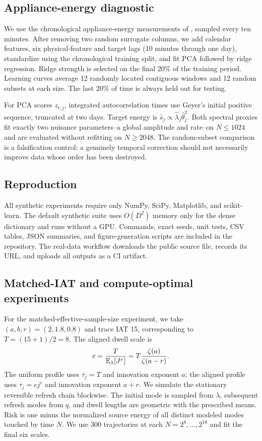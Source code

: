 \subsection{Appliance-energy diagnostic}
We use the chronological appliance-energy measurements of
\citet{candanedo2017appliances}, sampled every ten minutes. After removing two
random surrogate columns, we add calendar features, six physical-feature and
target lags (10 minutes through one day), standardize using the chronological
training split, and fit PCA followed by ridge regression. Ridge strength is
selected on the final 20\% of the training period. Learning curves average 12
randomly located contiguous windows and 12 random subsets at each size. The
last 20\% of time is always held out for testing.

For PCA scores $z_{t,j}$, integrated autocorrelation times use Geyer's initial
positive sequence, truncated at two days. Target energy is
$\widehat s_j\propto\widehat\lambda_j\widehat\theta_j^2$. Both spectral
proxies fit exactly two nuisance parameters--a global amplitude and rate--on
$N\le1024$ and are evaluated without refitting on $N\ge2048$. The random-subset
comparison is a falsification control: a genuinely temporal correction should
not necessarily improve data whose order has been destroyed.

\subsection{Reproduction}
All synthetic experiments require only NumPy, SciPy, Matplotlib, and
scikit-learn. The default synthetic suite uses $O(D^2)$ memory only for the
dense dictionary and runs without a GPU. Commands, exact seeds, unit tests,
CSV tables, JSON summaries, and figure-generation scripts are included in the
repository. The real-data workflow downloads the public source file, records
its URL, and uploads all outputs as a CI artifact.

\subsection{Matched-IAT and compute-optimal experiments}
For the matched-effective-sample-size experiment, we take
$(a,b,r)=(2,1.8,0.8)$ and trace IAT 15, corresponding to
$T=(15+1)/2=8$.  The aligned dwell scale is
\[
c=\frac{T}{\mathbb{E}_\lambda[J^r]}
=T\frac{\zeta(a)}{\zeta(a-r)}.
\]
The uniform profile uses $\tau_j=T$ and innovation exponent $a$; the aligned
profile uses $\tau_j=cj^r$ and innovation exponent $a+r$.  We simulate the
stationary reversible refresh chain blockwise.  The initial mode is sampled
from $\lambda$, subsequent refresh modes from $q$, and dwell lengths are
geometric with the prescribed means.  Risk is one minus the normalized source
energy of all distinct modeled modes touched by time $N$.  We use 300
trajectories at each $N=2^8,\ldots,2^{18}$ and fit the final six scales.

